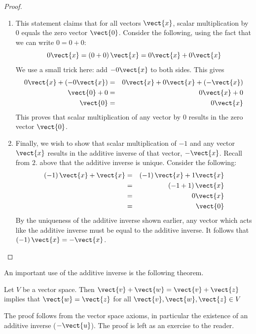 \begin{proof}
\begin{enumerate}
\item
This statement claims that for all vectors $\vect{x}$, scalar multiplication by $0$ equals the zero vector $\vect{0}$. Consider the following, using the fact that we can write $0=0+0$:
\begin{equation*}
0\vect{x}=\left( 0+0\right) \vect{x}=0\vect{x}+0\vect{x}
\end{equation*}
We use a small trick here: add $-0\vect{x}$ to both sides. This gives 
\begin{eqnarray*}
0\vect{x} + (-0\vect{x})&=&0\vect{x}+0\vect{x}+(-\vect{x})\\
\vect{0} + 0 &=&0\vect{x} + 0 \\
\vect{0} &=& 0\vect{x}
\end{eqnarray*}
This proves that scalar multiplication of any vector by $0$ results in the zero vector $\vect{0}$. 

\item
Finally, we wish to show that scalar multiplication of $-1$ and any vector $\vect{x}$ results in the additive inverse of that vector, $-\vect{x}$. Recall from $2.$ above that the additive inverse is unique. 
Consider the following: 
\begin{eqnarray*}
\left( -1\right) \vect{x}+\vect{x} & =&\left( -1\right) \vect{x}+1\vect{x}\\
&=&\left(-1+1\right) \vect{x} \\
&=&0\vect{x} \\
&=&\vect{0}
\end{eqnarray*}
By the uniqueness of the additive inverse shown earlier, any vector which acts like the additive inverse must be equal to the additive inverse. It follows that $\left( -1\right) 
\vect{x}=-\vect{x}$.
\end{enumerate}
\end{proof}

An important use of the additive inverse is the following theorem.

\begin{theorem}{}
Let $V$ be a vector space. Then $\vect{v} + \vect{w} = \vect{v} + \vect{z}$ implies that $\vect{w} = \vect{z}$ for all $\vect{v}, \vect{w}, \vect{z} \in V$
\end{theorem}

The proof follows from the vector space axioms, in particular the existence of an additive inverse ($-\vect{u}$). The proof is left as an exercise to the reader. 